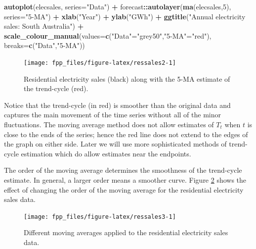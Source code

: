 \documentclass[]{book}
\newenvironment{Shaded}{\begin{snugshade}}{\end{snugshade}}
\newcommand{\DataTypeTok}[1]{\textcolor[rgb]{0.13,0.29,0.53}{#1}}
\newcommand{\DecValTok}[1]{\textcolor[rgb]{0.00,0.00,0.81}{#1}}
\newcommand{\KeywordTok}[1]{\textcolor[rgb]{0.13,0.29,0.53}{\textbf{#1}}}
\newcommand{\NormalTok}[1]{#1}
\newcommand{\OperatorTok}[1]{\textcolor[rgb]{0.81,0.36,0.00}{\textbf{#1}}}
\newcommand{\StringTok}[1]{\textcolor[rgb]{0.31,0.60,0.02}{#1}}
\begin{document}
\begin{Shaded}
\begin{Highlighting}[]
\KeywordTok{autoplot}\NormalTok{(elecsales, }\DataTypeTok{series=}\StringTok{"Data"}\NormalTok{) }\OperatorTok{+}
\StringTok{  }\NormalTok{forecast}\OperatorTok{::}\KeywordTok{autolayer}\NormalTok{(}\KeywordTok{ma}\NormalTok{(elecsales,}\DecValTok{5}\NormalTok{), }\DataTypeTok{series=}\StringTok{"5-MA"}\NormalTok{) }\OperatorTok{+}
\StringTok{  }\KeywordTok{xlab}\NormalTok{(}\StringTok{"Year"}\NormalTok{) }\OperatorTok{+}\StringTok{ }\KeywordTok{ylab}\NormalTok{(}\StringTok{"GWh"}\NormalTok{) }\OperatorTok{+}
\StringTok{  }\KeywordTok{ggtitle}\NormalTok{(}\StringTok{"Annual electricity sales: South Australia"}\NormalTok{) }\OperatorTok{+}
\StringTok{  }\KeywordTok{scale_colour_manual}\NormalTok{(}\DataTypeTok{values=}\KeywordTok{c}\NormalTok{(}\StringTok{"Data"}\NormalTok{=}\StringTok{"grey50"}\NormalTok{,}\StringTok{"5-MA"}\NormalTok{=}\StringTok{"red"}\NormalTok{),}
                     \DataTypeTok{breaks=}\KeywordTok{c}\NormalTok{(}\StringTok{"Data"}\NormalTok{,}\StringTok{"5-MA"}\NormalTok{))}
\end{Highlighting}
\end{Shaded}

\begin{figure}

{\centering \texttt{[image: fpp\_files/figure-latex/ressales2-1]} 

}

\caption{Residential electricity sales (black) along with the 5-MA estimate of the trend-cycle (red).}\label{fig:ressales2}
\end{figure}

Notice that the trend-cycle (in red) is smoother than the original data and captures the main movement of the time series without all of the minor fluctuations. The moving average method does not allow estimates of \(T_{t}\) when \(t\) is close to the ends of the series; hence the red line does not extend to the edges of the graph on either side. Later we will use more sophisticated methods of trend-cycle estimation which do allow estimates near the endpoints.

The order of the moving average determines the smoothness of the trend-cycle estimate. In general, a larger order means a smoother curve. Figure \ref{fig:ressales3} shows the effect of changing the order of the moving average for the residential electricity sales data.

\begin{figure}

{\centering \texttt{[image: fpp\_files/figure-latex/ressales3-1]} 

}

\caption{Different moving averages applied to the residential electricity sales data.}\label{fig:ressales3}
\end{figure}
\end{document}

